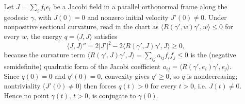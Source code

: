 \begin{lemma}
  \label{lem:dc-ch7-3-2-no-conjugate}
  \leanok
  Let $J=\sum_i f_i e_i$ be a Jacobi field in a parallel orthonormal frame along the
  geodesic $\gamma$, with $J(0)=0$ and nonzero initial velocity $J'(0)\ne 0$. Under
  nonpositive sectional curvature, read in the chart as $\langle R(\gamma',w)\gamma',w\rangle\le 0$
  for every $w$, the energy $q=\langle J,J\rangle$ satisfies
  $$
  \langle J,J\rangle''=2|J'|^2-2\langle R(\gamma',J)\gamma',J\rangle\ge 0,
  $$
  because the curvature term $\langle R(\gamma',J)\gamma',J\rangle=\sum_{ij}a_{ij}f_if_j\le 0$
  is the (negative semidefinite) quadratic form of the Jacobi coefficient
  $a_{ij}=\langle R(\gamma',e_i)\gamma',e_j\rangle$. Since $q(0)=0$ and $q'(0)=0$, convexity
  gives $q'\ge 0$, so $q$ is nondecreasing; nontriviality ($J'(0)\ne 0$) then forces
  $q(t)>0$ for every $t>0$, i.e. $J(t)\ne 0$. Hence no point $\gamma(t)$, $t>0$, is
  conjugate to $\gamma(0)$.
\end{lemma}

